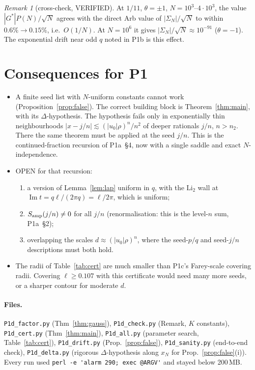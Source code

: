 \documentclass[11pt]{article}
\theoremstyle{definition}\newtheorem{definition}[theorem]{Definition}
\theoremstyle{remark}\newtheorem{remark}[theorem]{Remark}
\begin{document}
\begin{remark}[cross-check, VERIFIED]
At $1/11$, $\theta=\pm1$, $N=10^3$--$4\cdot10^3$, the value $|G^*|P(N)/\sqrt N$ agrees with the direct Arb value of $|\Sigma_N|/\sqrt N$ to within $0.6\%\to0.15\%$, i.e.\ $O(1/N)$.
At $N=10^6$ it gives $|\Sigma_N|/\sqrt N\approx10^{-91}$ ($\theta=-1$).
The exponential drift near odd $q$ noted in P1b is this effect.
\end{remark}

\section{Consequences for P1}
\begin{itemize}
\item A finite seed list with $N$-uniform constants cannot work (Proposition~\ref{prop:false}). The correct building block is Theorem~\ref{thm:main}, with its $\Delta$-hypothesis. The hypothesis fails only in exponentially thin neighbourhoods $|x-j/n|\lesssim(|u_0|\rho)^n/n^2$ of deeper rationals $j/n$, $n>n_2$. There the same theorem must be applied at the seed $j/n$. This is the continued-fraction recursion of P1a~\S4, now with a single saddle and exact $N$-independence.
\item OPEN for that recursion:
 \begin{enumerate}
 \item a version of Lemma~\ref{lem:lap} uniform in $q$, with the Li$_2$ wall at $\operatorname{Im}t=q\ell/(2\pi q)=\ell/2\pi$, which is uniform;
 \item $S_{\rm amp}(j/n)\ne0$ for all $j/n$ (renormalisation: this is the level-$n$ sum, P1a~\S2);
 \item overlapping the scales $d\approx(|u_0|\rho)^n$, where the seed-$p/q$ and seed-$j/n$ descriptions must both hold.
 \end{enumerate}
\item The radii of Table~\ref{tab:cert} are much smaller than P1c's Farey-scale covering radii. Covering $\ell\ge0.107$ with this certificate would need many more seeds, or a sharper contour for moderate $d$.
\end{itemize}

\paragraph{Files.} \texttt{P1d\_factor.py} (Thm~\ref{thm:gauss}), \texttt{P1d\_check.py} (Remark, $K$ constants), \texttt{P1d\_cert.py} (Thm~\ref{thm:main}), \texttt{P1d\_all.py} (parameter search, Table~\ref{tab:cert}), \texttt{P1d\_drift.py} (Prop.~\ref{prop:false}), \texttt{P1d\_sanity.py} (end-to-end check), \texttt{P1d\_delta.py} (rigorous $\Delta$-hypothesis along $x_N$ for Prop.~\ref{prop:false}(i)).
Every run used \verb|perl -e 'alarm 290; exec @ARGV'| and stayed below 200\,MB.
\end{document}
